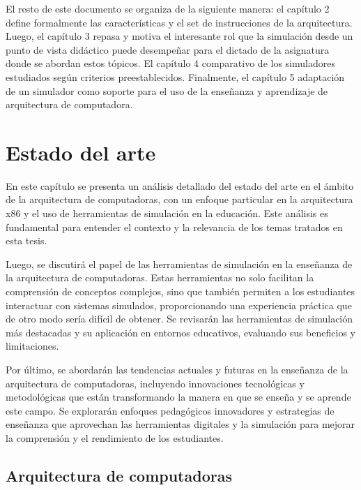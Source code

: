 \documentclass[12pt,twoside]{templates/unerthesis}
\begin{document}
El resto de este documento se organiza de la siguiente manera: el capítulo 2 define formalmente las características y el set de instrucciones de la arquitectura. Luego, el capítulo 3 repasa y motiva el interesante rol que la simulación desde un punto de vista didáctico puede desempeñar para el dictado de la asignatura donde se abordan estos tópicos. El capítulo 4 comparativo de los simuladores estudiados según criterios preestablecidos. Finalmente, el capítulo 5 adaptación de un simulador como soporte para el uso de la enseñanza y aprendizaje de arquitectura de computadora.

\hypertarget{estado-del-arte}{%
\chapter{Estado del arte}\label{estado-del-arte}}

En este capítulo se presenta un análisis detallado del estado del arte en el ámbito de la arquitectura de computadoras, con un enfoque particular en la arquitectura x86 y el uso de herramientas de simulación en la educación. Este análisis es fundamental para entender el contexto y la relevancia de los temas tratados en esta tesis.

Luego, se discutirá el papel de las herramientas de simulación en la enseñanza de la arquitectura de computadoras. Estas herramientas no solo facilitan la comprensión de conceptos complejos, sino que también permiten a los estudiantes interactuar con sistemas simulados, proporcionando una experiencia práctica que de otro modo sería difícil de obtener. Se revisarán las herramientas de simulación más destacadas y su aplicación en entornos educativos, evaluando sus beneficios y limitaciones.

Por último, se abordarán las tendencias actuales y futuras en la enseñanza de la arquitectura de computadoras, incluyendo innovaciones tecnológicas y metodológicas que están transformando la manera en que se enseña y se aprende este campo. Se explorarán enfoques pedagógicos innovadores y estrategias de enseñanza que aprovechan las herramientas digitales y la simulación para mejorar la comprensión y el rendimiento de los estudiantes.

\hypertarget{arquitectura-de-computadoras}{%
\section{Arquitectura de computadoras}\label{arquitectura-de-computadoras}}
\end{document}
